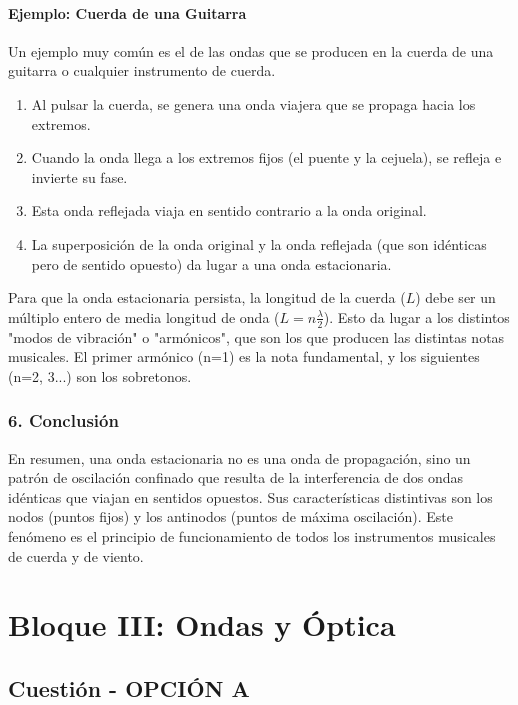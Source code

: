 \paragraph*{Ejemplo: Cuerda de una Guitarra}
Un ejemplo muy común es el de las ondas que se producen en la cuerda de una guitarra o cualquier instrumento de cuerda.
\begin{enumerate}
    \item Al pulsar la cuerda, se genera una onda viajera que se propaga hacia los extremos.
    \item Cuando la onda llega a los extremos fijos (el puente y la cejuela), se refleja e invierte su fase.
    \item Esta onda reflejada viaja en sentido contrario a la onda original.
    \item La superposición de la onda original y la onda reflejada (que son idénticas pero de sentido opuesto) da lugar a una onda estacionaria.
\end{enumerate}
Para que la onda estacionaria persista, la longitud de la cuerda ($L$) debe ser un múltiplo entero de media longitud de onda ($L=n\frac{\lambda}{2}$). Esto da lugar a los distintos "modos de vibración" o "armónicos", que son los que producen las distintas notas musicales. El primer armónico (n=1) es la nota fundamental, y los siguientes (n=2, 3...) son los sobretonos.

\subsubsection*{6. Conclusión}
\begin{cajaconclusion}
En resumen, una onda estacionaria no es una onda de propagación, sino un patrón de oscilación confinado que resulta de la interferencia de dos ondas idénticas que viajan en sentidos opuestos. Sus características distintivas son los nodos (puntos fijos) y los antinodos (puntos de máxima oscilación). Este fenómeno es el principio de funcionamiento de todos los instrumentos musicales de cuerda y de viento.
\end{cajaconclusion}

\newpage
\section{Bloque III: Ondas y Óptica}
\label{sec:optica_2012_sep}

\subsection{Cuestión - OPCIÓN A}
\label{subsec:IIIA_2012_sep}

